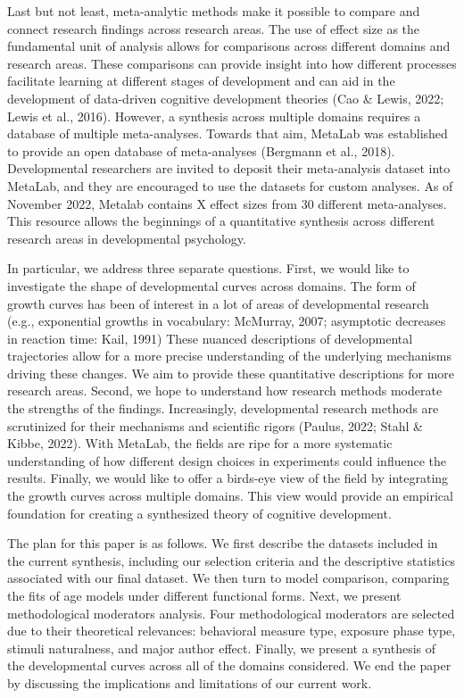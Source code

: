 \documentclass[10pt, letterpaper]{article}
\begin{document}
Last but not least, meta-analytic methods make it possible to compare
and connect research findings across research areas. The use of effect
size as the fundamental unit of analysis allows for comparisons across
different domains and research areas. These comparisons can provide
insight into how different processes facilitate learning at different
stages of development and can aid in the development of data-driven
cognitive development theories (Cao \& Lewis, 2022; Lewis et al., 2016).
However, a synthesis across multiple domains requires a database of
multiple meta-analyses. Towards that aim, MetaLab was established to
provide an open database of meta-analyses (Bergmann et al., 2018).
Developmental researchers are invited to deposit their meta-analysis
dataset into MetaLab, and they are encouraged to use the datasets for
custom analyses. As of November 2022, Metalab contains X effect sizes
from 30 different meta-analyses. This resource allows the beginnings of
a quantitative synthesis across different research areas in
developmental psychology.

In particular, we address three separate questions. First, we would like
to investigate the shape of developmental curves across domains. The
form of growth curves has been of interest in a lot of areas of
developmental research (e.g., exponential growths in vocabulary:
McMurray, 2007; asymptotic decreases in reaction time: Kail, 1991) These
nuanced descriptions of developmental trajectories allow for a more
precise understanding of the underlying mechanisms driving these
changes. We aim to provide these quantitative descriptions for more
research areas. Second, we hope to understand how research methods
moderate the strengths of the findings. Increasingly, developmental
research methods are scrutinized for their mechanisms and scientific
rigors (Paulus, 2022; Stahl \& Kibbe, 2022). With MetaLab, the fields
are ripe for a more systematic understanding of how different design
choices in experiments could influence the results. Finally, we would
like to offer a birds-eye view of the field by integrating the growth
curves across multiple domains. This view would provide an empirical
foundation for creating a synthesized theory of cognitive development.

The plan for this paper is as follows. We first describe the datasets
included in the current synthesis, including our selection criteria and
the descriptive statistics associated with our final dataset. We then
turn to model comparison, comparing the fits of age models under
different functional forms. Next, we present methodological moderators
analysis. Four methodological moderators are selected due to their
theoretical relevances: behavioral measure type, exposure phase type,
stimuli naturalness, and major author effect. Finally, we present a
synthesis of the developmental curves across all of the domains
considered. We end the paper by discussing the implications and
limitations of our current work.
\end{document}
